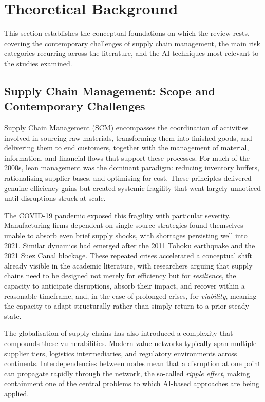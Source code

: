 \section{Theoretical Background}

This section establishes the conceptual foundations on which the review rests,
covering the contemporary challenges of supply chain management, the main
risk categories recurring across the literature, and the AI techniques most
relevant to the studies examined.
 
\subsection{Supply Chain Management: Scope and Contemporary Challenges}
 
Supply Chain Management (SCM) encompasses the coordination of activities
involved in sourcing raw materials, transforming them into finished goods, and
delivering them to end customers, together with the management of material,
information, and financial flows that support these processes. For much of the
2000s, lean management was the dominant paradigm: reducing inventory
buffers, rationalising supplier bases, and optimising for cost. These principles
delivered genuine efficiency gains but created systemic fragility that went
largely unnoticed until disruptions struck at scale.
 
The COVID-19 pandemic exposed this fragility with particular severity.
Manufacturing firms dependent on single-source strategies found themselves
unable to absorb even brief supply shocks, with shortages persisting well into
2021. Similar dynamics had emerged after the 2011 Tohoku earthquake and
the 2021 Suez Canal blockage. These repeated crises accelerated a conceptual
shift already visible in the academic literature, with researchers arguing that
supply chains need to be designed not merely for efficiency but for
\emph{resilience}, the capacity to anticipate disruptions, absorb their
impact, and recover within a reasonable timeframe, and, in the case of
prolonged crises, for \emph{viability}, meaning the capacity to adapt
structurally rather than simply return to a prior steady state.
 
The globalisation of supply chains has also introduced a complexity that
compounds these vulnerabilities. Modern value networks typically span
multiple supplier tiers, logistics intermediaries, and regulatory environments
across continents. Interdependencies between nodes mean that a disruption at
one point can propagate rapidly through the network, the so-called
\emph{ripple effect}, making containment one of the central problems to
which AI-based approaches are being applied.
 
